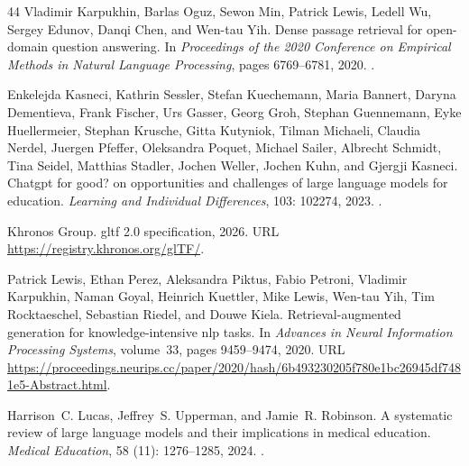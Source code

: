 \begin{thebibliography}{44}
Vladimir Karpukhin, Barlas Oguz, Sewon Min, Patrick Lewis, Ledell Wu, Sergey
  Edunov, Danqi Chen, and Wen-tau Yih.
\newblock Dense passage retrieval for open-domain question answering.
\newblock In \emph{Proceedings of the 2020 Conference on Empirical Methods in
  Natural Language Processing}, pages 6769--6781, 2020.
\newblock {}.

Enkelejda Kasneci, Kathrin Sessler, Stefan Kuechemann, Maria Bannert, Daryna
  Dementieva, Frank Fischer, Urs Gasser, Georg Groh, Stephan Guennemann, Eyke
  Huellermeier, Stephan Krusche, Gitta Kutyniok, Tilman Michaeli, Claudia
  Nerdel, Juergen Pfeffer, Oleksandra Poquet, Michael Sailer, Albrecht Schmidt,
  Tina Seidel, Matthias Stadler, Jochen Weller, Jochen Kuhn, and Gjergji
  Kasneci.
\newblock Chatgpt for good? on opportunities and challenges of large language
  models for education.
\newblock \emph{Learning and Individual Differences}, 103: 102274,
  2023.
\newblock {}.

{Khronos Group}.
\newblock gltf 2.0 specification, 2026.
\newblock URL \url{https://registry.khronos.org/glTF/}.

Patrick Lewis, Ethan Perez, Aleksandra Piktus, Fabio Petroni, Vladimir
  Karpukhin, Naman Goyal, Heinrich Kuettler, Mike Lewis, Wen-tau Yih, Tim
  Rocktaeschel, Sebastian Riedel, and Douwe Kiela.
\newblock Retrieval-augmented generation for knowledge-intensive nlp tasks.
\newblock In \emph{Advances in Neural Information Processing Systems},
  volume~33, pages 9459--9474, 2020.
\newblock URL
  \url{https://proceedings.neurips.cc/paper/2020/hash/6b493230205f780e1bc26945df7481e5-Abstract.html}.

Harrison~C. Lucas, Jeffrey~S. Upperman, and Jamie~R. Robinson.
\newblock A systematic review of large language models and their implications
  in medical education.
\newblock \emph{Medical Education}, 58 (11): 1276--1285,
  2024.
\newblock {}.


\end{thebibliography}
